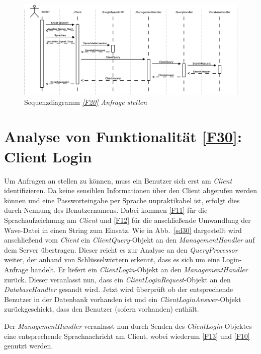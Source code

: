 \begin{figure}[h]
\centering
\includegraphics[width=1\textheight, angle=90]{Systementwurf/02_produktfunktionsanalyse/f200}
\caption{Sequenzdiagramm \textit{\ref{F20} Anfrage stellen}
\label{sd20}}
\end{figure}


\section{Analyse von Funktionalität \ref{F30}: Client Login}

Um Anfragen an \NewsGenie stellen zu können, muss ein Benutzer sich erst am
\textit{Client} identifizieren. Da keine sensiblen Informationen über den Client
abgerufen werden können und eine Passworteingabe per Sprache unpraktikabel ist,
erfolgt dies durch Nennung des Benutzernamens. Dabei kommen  \ref{F11} für die
Sprachaufzeichnung am \textit{Client} und \ref{F12} für die anschließende
Umwandlung der Wave-Datei in einen String zum Einsatz. Wie in Abb.~\ref{sd30}
dargestellt wird anschließend vom \textit{Client} ein
\textit{ClientQuery}-Objekt an den \textit{ManagementHandler} auf dem Server
übertragen. Dieser reicht es zur Analyse an den \textit{QueryProcessor} weiter,
der anhand von Schlüsselwörtern erkennt, dass es sich um eine Login-Anfrage
handelt. Er liefert ein \textit{ClientLogin}-Objekt an den
\textit{ManagementHandler} zurück. Dieser veranlasst nun, dass ein
\textit{ClientLoginRequest}-Objekt an den \textit{DatabaseHandler} gesandt wird.
Jetzt wird überprüft ob der entsprechende Benutzer in der Datenbank vorhanden
ist und ein \textit{ClientLoginAnswer}-Objekt zurückgeschickt, dass den Benutzer
(sofern vorhanden) enthält.

Der \textit{ManagementHandler} veranlasst nun durch Senden des
\textit{ClientLogin}-Objektes eine entsprechende Sprachnachricht am Client,
wobei wiederum \ref{F13} und \ref{F10} genutzt werden.

